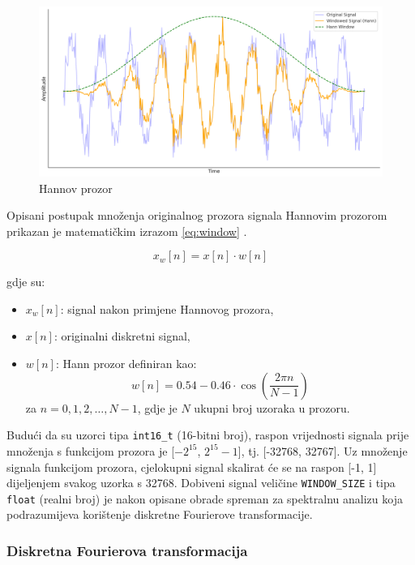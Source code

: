 \begin{figure}[htb]
    \centering
    \includegraphics[width=0.85\linewidth]{Chapters/struktura_sustava/generiranje_znacajki/hann.png} 
    \caption{Hannov prozor}
    \label{pic:hann}
\end{figure}

Opisani postupak množenja originalnog prozora signala Hannovim prozorom prikazan je 
matematičkim izrazom \eqref{eq:window} .

\begin{equation}
    x_w[n] = x[n] \cdot w[n]
    \label{eq:window}
\end{equation}

gdje su:
\begin{itemize}
    \item \( x_w[n] \): signal nakon primjene Hannovog prozora,
    \item \( x[n] \): originalni diskretni signal,
    \item \( w[n] \): Hann prozor definiran kao:
    \begin{equation}
        w[n] = 0.54 - 0.46 \cdot \cos\left( \frac{2 \pi n}{N-1} \right)
    \end{equation}
    za \( n = 0, 1, 2, \dots, N-1 \),
    gdje je \( N \) ukupni broj uzoraka u prozoru.
\end{itemize}

Budući da su uzorci tipa \texttt{int16\_t} (16-bitni broj), raspon vrijednosti signala 
prije množenja s funkcijom prozora je [$-2^{15}$, $2^{15} - 1$], tj. [-32768, 32767]. Uz množenje
signala funkcijom prozora, cjelokupni signal skalirat će se na raspon [-1, 1] dijeljenjem svakog
uzorka s 32768. Dobiveni signal veličine \texttt{WINDOW\_SIZE} i tipa \texttt{float} (realni broj) je nakon
opisane obrade spreman za spektralnu analizu koja podrazumijeva korištenje diskretne Fourierove
transformacije.

\subsubsection{Diskretna Fourierova transformacija}
\label{sec:fft}

